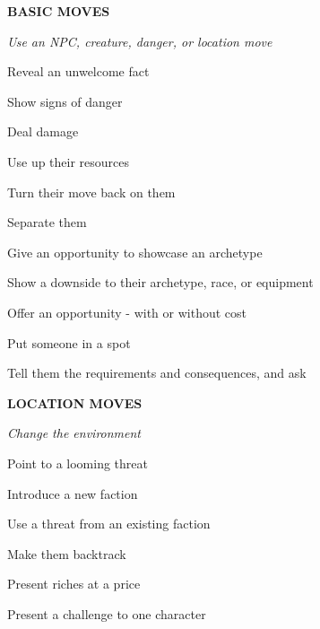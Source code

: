 \documentclass[oneside,10pt]{article}
\begin{document}
\begin{multicols}{2}
\textbf{BASIC MOVES}
\begin{adjustwidth*}{.5cm}{.5cm}
\setlength{\parskip}{.1em}\itshape
Use an NPC, creature, danger, or location move

Reveal an unwelcome fact

Show signs of danger

Deal damage

Use up their resources

Turn their move back on them

Separate them

Give an opportunity to showcase an archetype

Show a downside to their archetype, race, or
equipment

Offer an opportunity - with or without cost

Put someone in a spot

Tell them the requirements and consequences, and
ask
\end{adjustwidth*}

\textbf{LOCATION MOVES}
\begin{adjustwidth*}{.5cm}{.5cm}
\setlength{\parskip}{.1em}
\itshape
Change the environment

Point to a looming threat

Introduce a new faction

Use a threat from an existing faction

Make them backtrack

Present riches at a price

Present a challenge to one character
\end{adjustwidth*}

\end{multicols}
\end{document}

